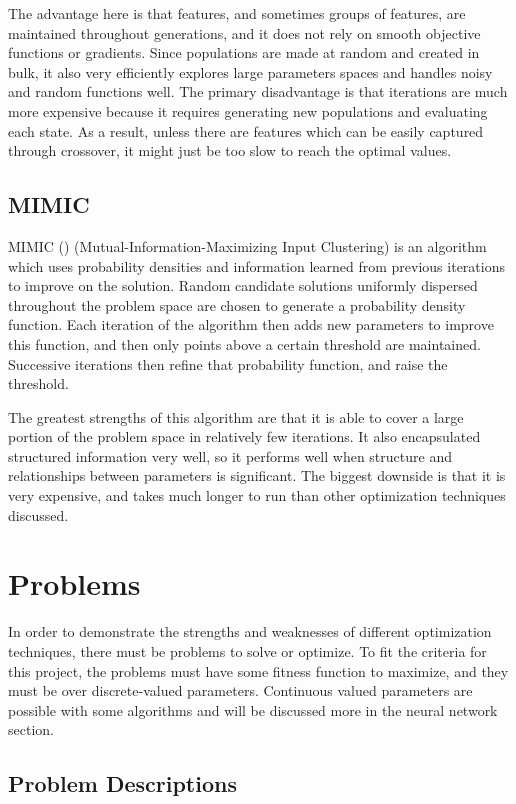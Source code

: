 \documentclass[
	letterpaper, %
]{mlreport}
\begin{document}
The advantage here is that features, and sometimes groups of features, are maintained throughout generations, and it does not rely on smooth objective functions or gradients. Since populations are made at random and created in bulk, it also very efficiently explores large parameters spaces and handles noisy and random functions well. The primary disadvantage is that iterations are much more expensive because it requires generating new populations and evaluating each state. As a result, unless there are features which can be easily captured through crossover, it might just be too slow to reach the optimal values.

\subsection{MIMIC}
MIMIC (\cite{Isbell97}) (Mutual-Information-Maximizing Input Clustering) is an algorithm which uses probability densities and information learned from previous iterations to improve on the solution. Random candidate solutions uniformly dispersed throughout the problem space are chosen to generate a probability density function. Each iteration of the algorithm then adds new parameters to improve this function, and then only points above a certain threshold are maintained. Successive iterations then refine that probability function, and raise the threshold.

The greatest strengths of this algorithm are that it is able to cover a large portion of the problem space in relatively few iterations. It also encapsulated structured information very well, so it performs well when structure and relationships between parameters is significant. The biggest downside is that it is very expensive, and takes much longer to run than other optimization techniques discussed.

\section{Problems}
In order to demonstrate the strengths and weaknesses of different optimization techniques, there must be problems to solve or optimize. To fit the criteria for this project, the problems must have some fitness function to maximize, and they must be over discrete-valued parameters. Continuous valued parameters are possible with some algorithms and will be discussed more in the neural network section.

\subsection{Problem Descriptions}
\end{document}
